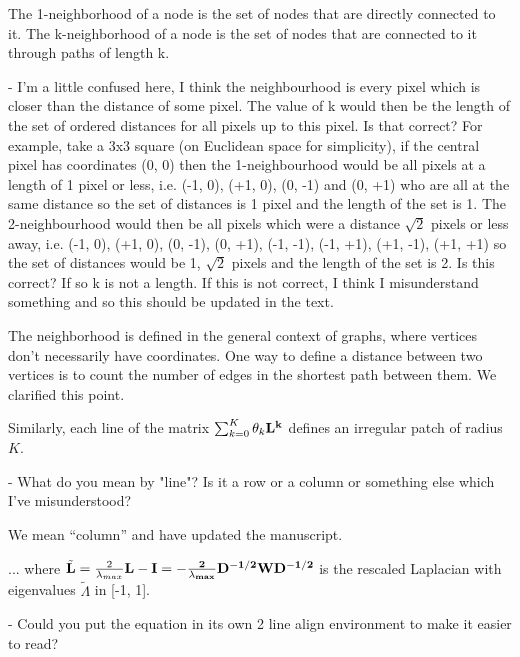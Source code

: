 \documentclass[12pt,a4paper]{article}
\newcommand{\1}{\b{1}}              %
\newcommand{\0}{\b{0}}              %
\begin{document}
\begin{mdframed}[style=comment]
The 1-neighborhood of a node is the set of nodes that are directly connected to it. The k-neighborhood of a node is the set of nodes that are connected to it through paths of length k.

- I'm a little confused here, I think the neighbourhood is every pixel which is closer than the distance of some pixel. The value of k would then be the length of the set of ordered distances for all pixels up to this pixel. Is that correct? For example, take a 3x3 square (on Euclidean space for simplicity), if the central pixel has coordinates (0, 0) then the 1-neighbourhood would be all pixels at a length of 1 pixel or less, i.e. (-1, 0), (+1, 0), (0, -1) and (0, +1) who are all at the same distance so the set of distances is {1} pixel and the length of the set is 1. The 2-neighbourhood would then be all pixels which were a distance $\sqrt{2}$ pixels or less away, i.e. (-1, 0), (+1, 0), (0, -1), (0, +1), (-1, -1), (-1, +1), (+1, -1), (+1, +1) so the set of distances would be {1, $\sqrt{2}$} pixels and the length of the set is 2. Is this correct? If so k is not a length. If this is not correct, I think I misunderstand something and so this should be updated in the text.
\end{mdframed}

The neighborhood is defined in the general context of graphs, where vertices don't necessarily have coordinates.
One way to define a distance between two vertices is to count the number of edges in the shortest path between them.
We clarified this point.


\begin{mdframed}[style=comment]
Similarly, each line of the matrix $\sum_{k=0}^K\theta_k\bf{L}^k$ defines an irregular patch of radius $K$.

 - What do you mean by "line"? Is it a row or a column or something else which I've misunderstood?
\end{mdframed}

We mean ``column'' and have updated the manuscript.

\begin{mdframed}[style=comment]
... where $\tilde{\bf{L}}= \frac{2}{\lambda_{max}}\bf{L}-\bf{I}=-\frac{2}{\lambda_{max}}\bf{D}^{-1/2}\bf{W}\bf{D}^{-1/2}$ is the rescaled Laplacian with eigenvalues $\tilde{\Lambda}$ in [-1, 1].

 - Could you put the equation in its own 2 line align environment to make it easier to read?
\end{mdframed}
\end{document}
